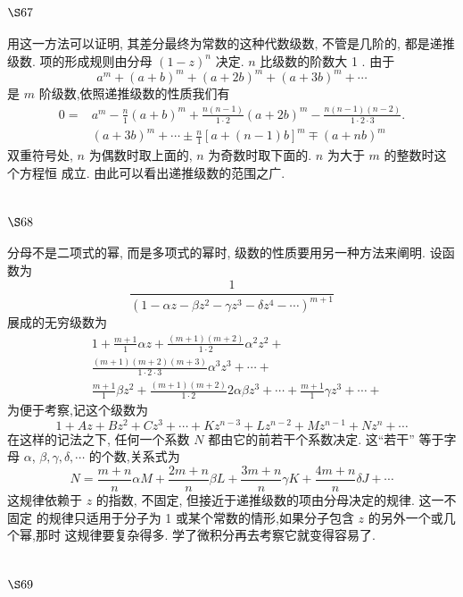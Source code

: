 \section{$\S 67$}

用这一方法可以证明, 其差分最终为常数的这种代数级数, 不管是几阶的, 都是递推 级数. 项的形成规则由分母 $(1-z)^{n}$ 决定. $n$ 比级数的阶数大 1 . 由于
\[
a^{m}+(a+b)^{m}+(a+2 b)^{m}+(a+3 b)^{m}+\cdots
\]
是 $m$ 阶级数,依照递推级数的性质我们有
\[
\begin{aligned}
0= & a^{m}-\frac{n}{1}(a+b)^{m}+\frac{n(n-1)}{1 \cdot 2}(a+2 b)^{m}-\frac{n(n-1)(n-2)}{1 \cdot 2 \cdot 3} . \\
& (a+3 b)^{m}+\cdots \pm \frac{n}{1}[a+(n-1) b]^{m} \mp(a+n b)^{m}
\end{aligned}
\]
双重符号处, $n$ 为偶数时取上面的, $n$ 为奇数时取下面的. $n$ 为大于 $m$ 的整数时这个方程恒 成立. 由此可以看出递推级数的范围之广.

\section{$\S 68$}

分母不是二项式的幂, 而是多项式的幂时, 级数的性质要用另一种方法来阐明. 设函 数为
\[
\frac{1}{\left(1-\alpha z-\beta z^{2}-\gamma z^{3}-\delta z^{4}-\cdots\right)^{m+1}}
\]
展成的无穷级数为 
\[
\begin{aligned}
& 1+\frac{m+1}{1} \alpha z+\frac{(m+1)(m+2)}{1 \cdot 2} \alpha^{2} z^{2}+ \\
& \frac{(m+1)(m+2)(m+3)}{1 \cdot 2 \cdot 3} \alpha^{3} z^{3}+\cdots+ \\
& \frac{m+1}{1} \beta z^{2}+\frac{(m+1)(m+2)}{1 \cdot 2} 2 \alpha \beta z^{3}+\cdots+\frac{m+1}{1} \gamma z^{3}+\cdots+
\end{aligned}
\]
为便于考察,记这个级数为
\[
1+A z+B z^{2}+C z^{3}+\cdots+K z^{n-3}+L z^{n-2}+M z^{n-1}+N z^{n}+\cdots
\]
在这样的记法之下, 任何一个系数 $N$ 都由它的前若干个系数决定. 这“若干” 等于字母 $\alpha$, $\beta, \gamma, \delta, \cdots$ 的个数,关系式为
\[
N=\frac{m+n}{n} \alpha M+\frac{2 m+n}{n} \beta L+\frac{3 m+n}{n} \gamma K+\frac{4 m+n}{n} \delta J+\cdots
\]
这规律依赖于 $z$ 的指数, 不固定, 但接近于递推级数的项由分母决定的规律. 这一不固定 的规律只适用于分子为 1 或某个常数的情形,如果分子包含 $z$ 的另外一个或几个幂,那时 这规律要复杂得多. 学了微积分再去考察它就变得容易了.

\section{$\S 69$}

